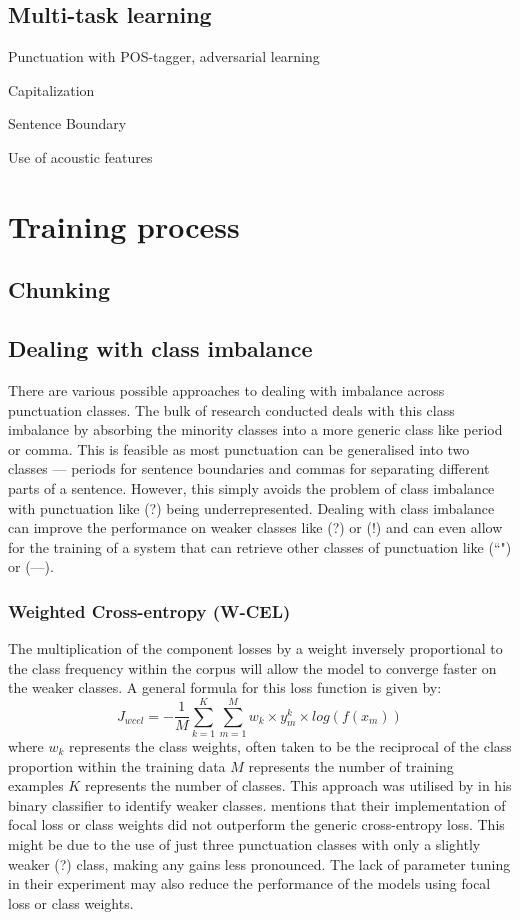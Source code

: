 \documentclass[a4paper]{article}
\begin{document}
\subsection{Multi-task learning}
Punctuation with POS-tagger, adversarial learning

Capitalization

Sentence Boundary \cite{dynamiccrf}

Use of acoustic features


\section{Training process}
\subsection{Chunking}
\subsection{Dealing with class imbalance}
There are various possible approaches to dealing with imbalance across punctuation classes. The bulk of research conducted deals with this class imbalance by absorbing the minority classes into a more generic class like period or comma. This is feasible as most punctuation can be generalised into two classes --- periods for sentence boundaries and commas for separating different parts of a sentence. However, this simply avoids the problem of class imbalance with punctuation like (?) being underrepresented. Dealing with class imbalance can improve the performance on weaker classes like (?) or (!) and can even allow for the training of a system that can retrieve other classes of punctuation like (``") or (---). 
\subsubsection{Weighted Cross-entropy (W-CEL)}
The multiplication of the component losses by a weight inversely proportional to the class frequency within the corpus will allow the model to converge faster on the weaker classes. A general formula for this loss function is given by: \[
J_{wcel}=-\frac{1}{M}\sum_{k=1}^{K}\sum_{m=1}^{M}w_k \times y_m^k \times log(f(x_m))
\] where \newline
$w_k$ represents the class weights, often taken to be the reciprocal of the class proportion within the training data \newline
$M$ represents the number of training examples \newline
$K$ represents the number of classes.
This approach was utilised by \cite{adaptivenerunbalanceddata} in his binary classifier to identify weaker classes. \citet{efficientbertrobust} mentions that their implementation of focal loss or class weights did not outperform the generic cross-entropy loss. This might be due to the use of just three punctuation classes with only a slightly weaker (?) class, making any gains less pronounced. The lack of parameter tuning in their experiment may also reduce the performance of the models using focal loss or class weights.
\end{document}
